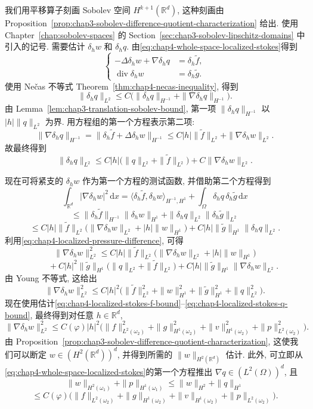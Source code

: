 \begin{Proof}
我们用平移算子刻画 Sobolev 空间 $H^{k+1}(\mathbb R^d)$, 这种刻画由 Proposition~\ref{prop:chap3-sobolev-difference-quotient-characterization} 给出. 使用 Chapter~\ref{chap:sobolev-spaces} 的 Section~\ref{sec:chap3-sobolev-lipschitz-domains} 中引入的记号. 需要估计 $\delta_h w$ 和 $\delta_h q$. 由\eqref{eq:chap4-whole-space-localized-stokes}得到
\[
 \left\{
 \begin{aligned}
  -\Delta\delta_h w+\nabla\delta_h q&=\delta_h\widetilde f,\\
  \operatorname{div}\delta_h w&=\delta_h\widetilde g.
 \end{aligned}
 \right.
\]
使用 Nečas 不等式 Theorem~\ref{thm:chap4-necas-inequality}, 得到
\[
 \|\delta_hq\|_{L^2}\leq C\bigl(\|\delta_hq\|_{H^{-1}}+\|\nabla\delta_hq\|_{H^{-1}}\bigr).
\]
由 Lemma~\ref{lem:chap3-translation-sobolev-bound}, 第一项 $\|\delta_hq\|_{H^{-1}}$ 以 $|h|\|q\|_{L^2}$ 为界. 用方程组的第一个方程表示第二项:
\[
 \|\nabla\delta_hq\|_{H^{-1}}
 =\|\delta_h\widetilde f+\Delta\delta_hw\|_{H^{-1}}
 \leq C|h|\|\widetilde f\|_{L^2}+\|\nabla\delta_hw\|_{L^2}.
\]
故最终得到
\begin{equation}
 \|\delta_hq\|_{L^2}
 \leq C|h|\bigl(\|q\|_{L^2}+\|\widetilde f\|_{L^2}\bigr)
 +C\|\nabla\delta_hw\|_{L^2}.
 \label{eq:chap4-localized-pressure-difference}
\end{equation}

现在可将紧支的 $\delta_hw$ 作为第一个方程的测试函数, 并借助第二个方程得到
\[
 \int_{\mathbb R^d}|\nabla\delta_hw|^2\,\mathrm dx
 =\langle\delta_h\widetilde f,\delta_hw\rangle_{H^{-1},H^1}
 +\int_\Omega\delta_hq\,\delta_h\widetilde g\,\mathrm dx
\]
\[
 \leq\|\delta_h\widetilde f\|_{H^{-1}}\|\delta_hw\|_{H^1}
 +\|\delta_hq\|_{L^2}\|\delta_h\widetilde g\|_{L^2}
\]
\[
 \leq C|h|\|\widetilde f\|_{L^2}
 \bigl(\|\nabla\delta_hw\|_{L^2}+|h|\|w\|_{H^1}\bigr)
 +C|h|\|\widetilde g\|_{H^1}\|\delta_hq\|_{L^2}.
\]
利用\eqref{eq:chap4-localized-pressure-difference}, 可得
\[
 \|\nabla\delta_hw\|_{L^2}^2
 \leq C|h|\|\widetilde f\|_{L^2}
 \bigl(\|\nabla\delta_hw\|_{L^2}+|h|\|w\|_{H^1}\bigr)
\]
\[
 \qquad+C|h|^2\|\widetilde g\|_{H^1}
 \bigl(\|q\|_{L^2}+\|\widetilde f\|_{L^2}\bigr)
 +C|h|\|\widetilde g\|_{H^1}\|\nabla\delta_hw\|_{L^2}.
\]
由 Young 不等式, 这给出
\[
 \|\nabla\delta_hw\|_{L^2}^2
 \leq C|h|^2\bigl(\|\widetilde f\|_{L^2}^2+\|w\|_{H^1}^2
 +\|\widetilde g\|_{H^1}^2+\|q\|_{L^2}^2\bigr).
\]
现在使用估计\eqref{eq:chap4-localized-stokes-f-bound}--\eqref{eq:chap4-localized-stokes-q-bound}, 最终得到对任意 $h\in\mathbb R^d$,
\[
 \|\nabla\delta_hw\|_{L^2}^2
 \leq C(\varphi)|h|^2\bigl(\|f\|_{L^2(\omega_2)}^2+\|g\|_{H^1(\omega_2)}^2
 +\|v\|_{H^1(\omega_2)}^2+\|p\|_{L^2(\omega_2)}^2\bigr).
\]
由 Proposition~\ref{prop:chap3-sobolev-difference-quotient-characterization}, 这使我们可以断定 $w\in(H^2(\mathbb R^d))^d$, 并得到所需的 $\|w\|_{H^2(\mathbb R^d)}$ 估计. 此外, 可立即从\eqref{eq:chap4-whole-space-localized-stokes}的第一个方程推出 $\nabla q\in(L^2(\Omega))^d$, 且
\[
 \|w\|_{H^2(\omega_1)}+\|p\|_{H^1(\omega_1)}
 \leq\|w\|_{H^2}+\|q\|_{H^1}
\]
\[
 \leq C(\varphi)\bigl(\|f\|_{L^2(\omega_2)}+\|g\|_{H^1(\omega_2)}
 +\|v\|_{H^1(\omega_2)}+\|p\|_{L^2(\omega_2)}\bigr).
\]
\end{Proof}

